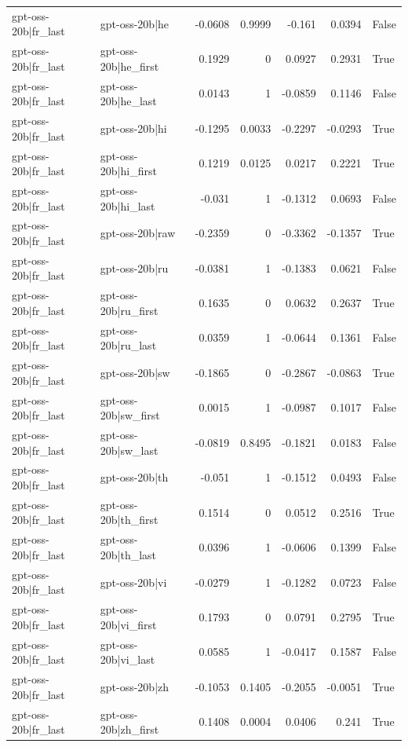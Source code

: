 \begin{table}
\begin{tabular}{l l r r r r l}
gpt-oss-20b|fr_last & gpt-oss-20b|he & -0.0608 & 0.9999 & -0.161 & 0.0394 & False \\
gpt-oss-20b|fr_last & gpt-oss-20b|he_first & 0.1929 & 0 & 0.0927 & 0.2931 & True \\
gpt-oss-20b|fr_last & gpt-oss-20b|he_last & 0.0143 & 1 & -0.0859 & 0.1146 & False \\
gpt-oss-20b|fr_last & gpt-oss-20b|hi & -0.1295 & 0.0033 & -0.2297 & -0.0293 & True \\
gpt-oss-20b|fr_last & gpt-oss-20b|hi_first & 0.1219 & 0.0125 & 0.0217 & 0.2221 & True \\
gpt-oss-20b|fr_last & gpt-oss-20b|hi_last & -0.031 & 1 & -0.1312 & 0.0693 & False \\
gpt-oss-20b|fr_last & gpt-oss-20b|raw & -0.2359 & 0 & -0.3362 & -0.1357 & True \\
gpt-oss-20b|fr_last & gpt-oss-20b|ru & -0.0381 & 1 & -0.1383 & 0.0621 & False \\
gpt-oss-20b|fr_last & gpt-oss-20b|ru_first & 0.1635 & 0 & 0.0632 & 0.2637 & True \\
gpt-oss-20b|fr_last & gpt-oss-20b|ru_last & 0.0359 & 1 & -0.0644 & 0.1361 & False \\
gpt-oss-20b|fr_last & gpt-oss-20b|sw & -0.1865 & 0 & -0.2867 & -0.0863 & True \\
gpt-oss-20b|fr_last & gpt-oss-20b|sw_first & 0.0015 & 1 & -0.0987 & 0.1017 & False \\
gpt-oss-20b|fr_last & gpt-oss-20b|sw_last & -0.0819 & 0.8495 & -0.1821 & 0.0183 & False \\
gpt-oss-20b|fr_last & gpt-oss-20b|th & -0.051 & 1 & -0.1512 & 0.0493 & False \\
gpt-oss-20b|fr_last & gpt-oss-20b|th_first & 0.1514 & 0 & 0.0512 & 0.2516 & True \\
gpt-oss-20b|fr_last & gpt-oss-20b|th_last & 0.0396 & 1 & -0.0606 & 0.1399 & False \\
gpt-oss-20b|fr_last & gpt-oss-20b|vi & -0.0279 & 1 & -0.1282 & 0.0723 & False \\
gpt-oss-20b|fr_last & gpt-oss-20b|vi_first & 0.1793 & 0 & 0.0791 & 0.2795 & True \\
gpt-oss-20b|fr_last & gpt-oss-20b|vi_last & 0.0585 & 1 & -0.0417 & 0.1587 & False \\
gpt-oss-20b|fr_last & gpt-oss-20b|zh & -0.1053 & 0.1405 & -0.2055 & -0.0051 & True \\
gpt-oss-20b|fr_last & gpt-oss-20b|zh_first & 0.1408 & 0.0004 & 0.0406 & 0.241 & True \\

\end{tabular}
\end{table}
